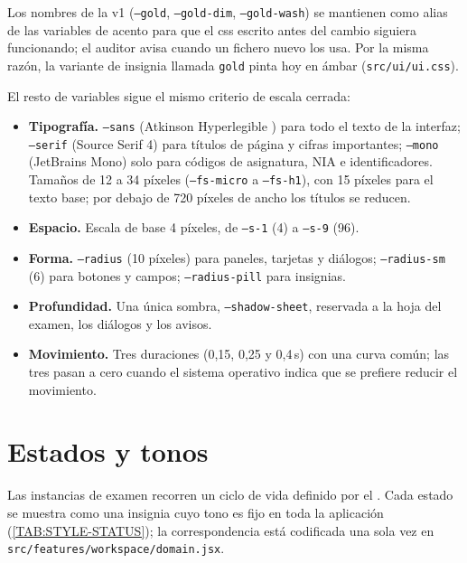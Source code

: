 Los nombres de la v1 (\texttt{--gold}, \texttt{--gold-dim}, \texttt{--gold-wash}) se
mantienen como alias de las variables de acento para que el \acs{css} escrito antes del
cambio siguiera funcionando; el auditor avisa cuando un fichero nuevo los usa. Por la
misma razón, la variante de insignia llamada \texttt{gold} pinta hoy en ámbar
(\texttt{src/ui/ui.css}).

El resto de variables sigue el mismo criterio de escala cerrada:
\begin{itemize}
  \item \textbf{Tipografía.} \texttt{--sans} (Atkinson Hyperlegible
        \cite{atkinson_hyperlegible}) para todo el texto de la interfaz;
        \texttt{--serif} (Source Serif 4) para títulos de página y cifras
        importantes; \texttt{--mono} (JetBrains Mono) solo para códigos de
        asignatura, NIA e identificadores. Tamaños de 12 a 34 píxeles
        (\texttt{--fs-micro} a \texttt{--fs-h1}), con 15 píxeles para el texto
        base; por debajo de 720 píxeles de ancho los títulos se reducen.
  \item \textbf{Espacio.} Escala de base 4 píxeles, de \texttt{--s-1} (4) a
        \texttt{--s-9} (96).
  \item \textbf{Forma.} \texttt{--radius} (10 píxeles) para paneles, tarjetas y
        diálogos; \texttt{--radius-sm} (6) para botones y campos;
        \texttt{--radius-pill} para insignias.
  \item \textbf{Profundidad.} Una única sombra, \texttt{--shadow-sheet}, reservada
        a la hoja del examen, los diálogos y los avisos.
  \item \textbf{Movimiento.} Tres duraciones (0,15, 0,25 y 0,4\,s) con una curva
        común; las tres pasan a cero cuando el sistema operativo indica que se
        prefiere reducir el movimiento.
\end{itemize}

\section*{Estados y tonos}

Las instancias de examen recorren un ciclo de vida definido por el . Cada
estado se muestra como una insignia cuyo tono es fijo en toda la aplicación
(\cref{TAB:STYLE-STATUS}); la correspondencia está codificada una sola vez en
\texttt{src/features/workspace/domain.jsx}.

